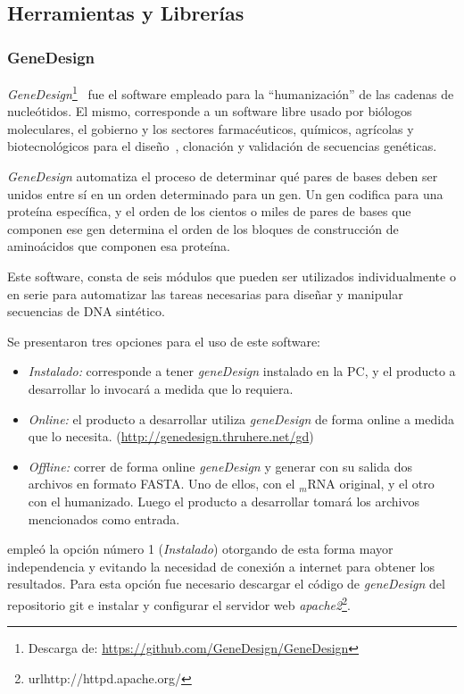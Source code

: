 \subsection{Herramientas y Librerías}
\subsubsection{GeneDesign}
\emph{GeneDesign}\footnote{Descarga de: \url{https://github.com/GeneDesign/GeneDesign}}~\cite{geneDesign} fue el software empleado para la ``humanización'' de las cadenas de nucleótidos. El mismo, corresponde a un software libre usado por biólogos moleculares, el gobierno y los sectores farmacéuticos, químicos, agrícolas y biotecnológicos para el diseño~\cite{Welch}, clonación y validación de secuencias genéticas.

\par \emph{GeneDesign} automatiza el proceso de determinar qué pares de bases deben ser unidos entre sí en un orden determinado para un gen. Un gen codifica para una proteína específica, y el orden de los cientos o miles de pares de bases que componen ese gen determina el orden de los bloques de construcción de aminoácidos que componen esa proteína.  

\par Este software, consta de seis módulos que pueden ser utilizados individualmente o en serie para automatizar las tareas necesarias para diseñar y manipular secuencias de DNA sintético. 

\par Se presentaron tres opciones para el uso de este software:
	\begin{itemize}
		\item \emph{Instalado:} corresponde a tener \emph{geneDesign} instalado en la PC, y el producto a desarrollar lo invocará a medida que lo requiera.
		\item \emph{Online:} el producto a desarrollar utiliza \emph{geneDesign} de forma online a medida que lo necesita. (\url{http://genedesign.thruhere.net/gd})
		\item \emph{Offline:} correr de forma online \emph{geneDesign} y generar con su salida dos archivos en formato FASTA. Uno de ellos, con el $_m$RNA original, y el otro con el humanizado. Luego el producto a desarrollar tomará los archivos mencionados como entrada.
	\end{itemize}
	
\par \remo empleó la opción número 1 (\emph{Instalado}) otorgando de esta forma mayor independencia y evitando la necesidad de conexión a internet para obtener los resultados. Para esta opción fue necesario descargar el código de \emph{geneDesign} del repositorio git e instalar y configurar el servidor web \emph{apache2}\footnote{url{http://httpd.apache.org/}}.

